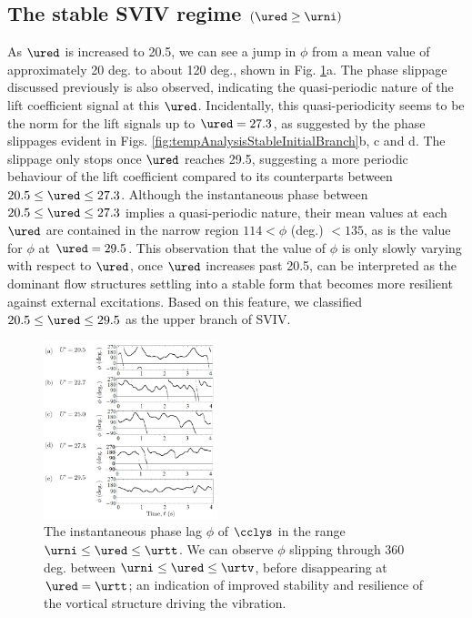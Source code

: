 \documentclass[a4paper,fleqn]{cas-sc}
\begin{document}
\subsection{The stable SVIV regime $\left ( \ured \geq \urni \right )$} \label{ssec:svivRegime}
As $\ured$ is increased to 20.5, we can see a jump in $\phi$ from a mean value of approximately 20 deg. to about 120 deg., shown in Fig. \ref{fig:phaseAngle}a. The phase slippage discussed previously is also observed, indicating the quasi-periodic nature of the lift coefficient signal at this $\ured$. Incidentally, this quasi-periodicity seems to be the norm for the lift signals up to $\ured = 27.3$, as suggested by the phase slippages evident in Figs. \ref{fig:tempAnalysisStableInitialBranch}b, c and d. The slippage only stops once $\ured$ reaches 29.5, suggesting a more periodic behaviour of the lift coefficient compared to its counterparts between $20.5 \leq \ured \leq 27.3$. Although the instantaneous phase between $20.5 \leq \ured \leq 27.3$ implies a quasi-periodic nature, their mean values at each $\ured$ are contained in the narrow region $114 < \phi$ (deg.) $< 135$, as is the value for $\phi$ at $\ured = 29.5$. This observation that the value of $\phi$ is only slowly varying with respect to $\ured$, once $\ured$ increases past 20.5, can be interpreted as the dominant flow structures settling into a stable form that becomes more resilient against external excitations. Based on this feature, we classified $20.5 \leq \ured \leq 29.5$ as the upper branch of SVIV.

\begin{figure}
  \centering
  \includegraphics[width=0.45\textwidth]{figs/figure18}
  \caption{The instantaneous phase lag $\phi$ of $\cclys$ in the range $\urni \leq \ured \leq \urtt$. We can observe $\phi$ slipping through 360 deg. between $\urni \leq \ured \leq \urtv$, before disappearing at $\ured = \urtt$; an indication of improved stability and resilience of the vortical structure driving the vibration.}
  \label{fig:phaseAngle}
\end{figure}
\end{document}
